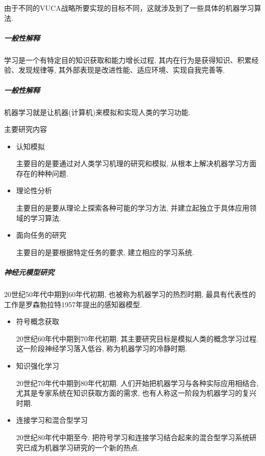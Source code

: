 由于不同的VUCA战略所要实现的目标不同，这就涉及到了一些具体的机器学习算法.
\subparagraph{一般性解释}
学习是一个有特定目的知识获取和能力增长过程, 其内在行为是获得知识、积累经验、发现规律等, 其外部表现是改进性能、适应环境、实现自我完善等.
\subparagraph{一般性解释}
机器学习就是让机器(计算机)来模拟和实现人类的学习功能.

主要研究内容
\begin{itemize}
\item 认知模拟

    主要目的是要通过对人类学习机理的研究和模拟, 从根本上解决机器学习方面存在的种种问题.
\item 理论性分析

     主要目的是要从理论上探索各种可能的学习方法, 并建立起独立于具体应用领域的学习算法.
\item 面向任务的研究

    主要目的是要根据特定任务的要求, 建立相应的学习系统.
\end{itemize}
\subparagraph{神经元模型研究}
 20世纪50年代中期到60年代初期, 也被称为机器学习的热烈时期, 最具有代表性的工作是罗森勃拉特1957年提出的感知器模型.
\begin{itemize}
\item 符号概念获取

    20世纪60年代中期到70年代初期. 其主要研究目标是模拟人类的概念学习过程. 这一阶段神经学习落入低谷, 称为机器学习的冷静时期.
\item 知识强化学习

    20世纪70年代中期到80年代初期. 人们开始把机器学习与各种实际应用相结合, 尤其是专家系统在知识获取方面的需求, 也有人称这一阶段为机器学习的复兴时期.
\item 连接学习和混合型学习

    20世纪80年代中期至今. 把符号学习和连接学习结合起来的混合型学习系统研究已成为机器学习研究的一个新的热点.
\end{itemize}
